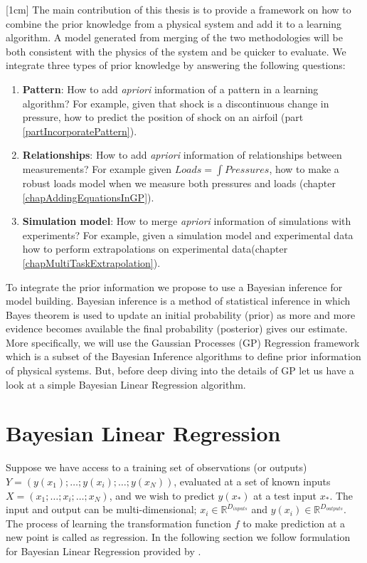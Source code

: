 \begin{mdframed}[hidealllines=true,backgroundcolor=blue!20]
[1cm]
The main contribution of this thesis is to provide a framework on how to combine the prior knowledge from a physical system and add it to a learning algorithm. A model generated from merging of the two methodologies will be both consistent with the physics of the system and be quicker to evaluate. We integrate three types of prior knowledge by answering the following questions:
\begin{enumerate}
\item \textbf{Pattern}: How to add \textit{apriori} information of a pattern in a learning algorithm? For example, given that shock is a discontinuous change in pressure, how to predict the position of shock on an airfoil (part \ref{partIncorporatePattern}). 
\item \textbf{Relationships}: How to add \textit{apriori} information of relationships between measurements? For example given $Loads = \int Pressures$, how to make a robust loads model when we measure both pressures and loads (chapter \ref{chapAddingEquationsInGP}).
\item \textbf{Simulation model}: How to merge \textit{apriori} information of simulations with experiments? For example, given a simulation model and experimental data how to perform extrapolations on experimental data(chapter \ref{chapMultiTaskExtrapolation}). 
\end{enumerate}

To integrate the prior information we propose to use a Bayesian inference for model building. Bayesian inference is a method of statistical inference in which Bayes theorem is used to update an initial probability (prior) as more and more evidence becomes available the final probability (posterior) gives our estimate. More specifically, we will use the Gaussian Processes (GP) Regression framework which is a subset of the Bayesian Inference algorithms to define prior information of physical systems. But, before deep diving into the details of GP let us have a look at a simple Bayesian Linear Regression algorithm.
\end{mdframed}

\section{Bayesian Linear Regression}\label{secBayesianModelling}
Suppose we have access to a training set of observations (or outputs) $Y = (y(x_{1}); \ldots ; y(x_{i}); \ldots ; y(x_{N}))$, evaluated at a set of known inputs $X = (x_{1}; \ldots ; x_{i}; \ldots; x_{N})$, and we wish to predict $y(x_{*})$ at a test input $x_{*}$. The input and output can be multi-dimensional; $x_{i} \in \mathbb{R}^{D_{inputs}}$ and $y(x_{i}) \in \mathbb{R}^{D_{outputs}}$. The process of learning the transformation function $f$ to make prediction at a new point is called as regression. In the following section we follow formulation for Bayesian Linear Regression provided by \cite{mackay2003information}.

